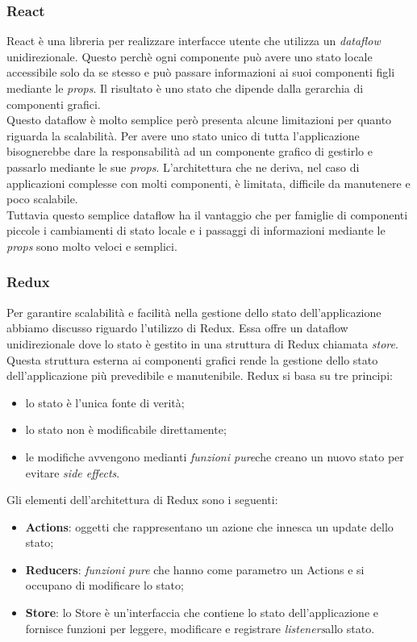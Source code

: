 \subsubsection*{React}
React è una libreria per realizzare interfacce utente che utilizza un \emph{dataflow} unidirezionale. Questo perchè ogni componente può avere uno stato locale accessibile solo da se stesso e può passare informazioni ai suoi componenti figli mediante le \emph{props}\glo. Il risultato è uno stato che dipende dalla gerarchia di componenti grafici. \\
Questo dataflow è molto semplice però presenta alcune limitazioni per quanto riguarda la scalabilità. Per avere uno stato unico di tutta l'applicazione bisognerebbe dare la responsabilità ad un componente grafico di gestirlo e passarlo mediante le sue \emph{props}. L'architettura che ne deriva, nel caso di applicazioni complesse con molti componenti, è limitata, difficile da manutenere e poco scalabile. \\
Tuttavia questo semplice dataflow ha il vantaggio che per famiglie di componenti piccole i cambiamenti di stato locale e i passaggi di informazioni mediante le \emph{props} sono molto veloci e semplici.

\subsubsection*{Redux}
Per garantire scalabilità e facilità nella gestione dello stato dell'applicazione abbiamo discusso riguardo l'utilizzo di Redux. Essa offre un dataflow unidirezionale dove lo stato è gestito in una struttura di Redux chiamata \emph{store}. Questa struttura esterna ai componenti grafici rende la gestione dello stato dell'applicazione più prevedibile e manutenibile. Redux si basa su tre principi:
\begin{itemize}
	\item lo stato è l'unica fonte di verità;
	\item lo stato non è modificabile direttamente;
	\item le modifiche avvengono medianti \emph{funzioni pure}\glosp che creano un nuovo stato per evitare \emph{side effects}\glo.
\end{itemize}
\noindent
Gli elementi dell'architettura di Redux sono i seguenti:
\begin{itemize}
	\item \textbf{Actions}: oggetti che rappresentano un azione che innesca un update dello stato;
	\item \textbf{Reducers}: \emph{funzioni pure} che hanno come parametro un Actions e si occupano di modificare lo stato;
	\item \textbf{Store}: lo Store è un'interfaccia che contiene lo stato dell'applicazione e fornisce funzioni per leggere, modificare e registrare \emph{listeners}\glosp allo stato.
\end{itemize}
\noindent


